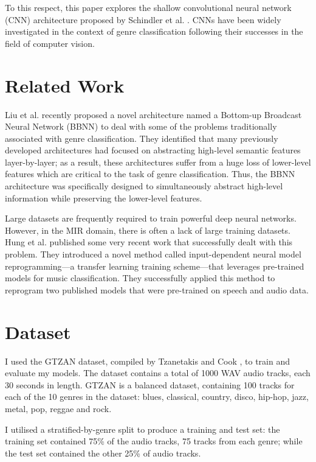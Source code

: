 \documentclass[conference]{IEEEtran}
\begin{document}
To this respect, this paper explores the shallow convolutional neural network (CNN) architecture proposed by Schindler et al. \cite{SchindlerLidyRauber}.
CNNs have been widely investigated in the context of genre classification following their successes in the field of computer vision.

\section{Related Work}

Liu et al. \cite{LiuFengLiuWangLiu} recently proposed a novel architecture named a Bottom-up Broadcast Neural Network (BBNN) to deal with some of the problems traditionally associated with genre classification.
They identified that many previously developed architectures had focused on abstracting high-level semantic features layer-by-layer; as a result, these architectures suffer from a huge loss of lower-level features which are critical to the task of genre classification.
Thus, the BBNN architecture was specifically designed to simultaneously abstract high-level information while preserving the lower-level features.

Large datasets are frequently required to train powerful deep neural networks.
However, in the MIR domain, there is often  a lack of large training datasets.
Hung et al. \cite{HungYangChenLerch} published some very recent work that successfully dealt with this problem.
They introduced a novel method called input-dependent neural model reprogramming---a transfer learning training scheme---that leverages pre-trained models for music classification.
They successfully applied this method to reprogram two published models that were pre-trained on speech and audio data.

\section{Dataset}

I used the GTZAN dataset, compiled by Tzanetakis and Cook \cite{TzanetakisCook}, to train and evaluate my models.
The dataset contains a total of 1000 WAV audio tracks, each 30 seconds in length.
GTZAN is a balanced dataset, containing 100 tracks for each of the 10 genres in the dataset: blues, classical, country, disco, hip-hop, jazz, metal, pop, reggae and rock.

I utilised a stratified-by-genre split to produce a training and test set: the training set contained 75\% of the audio tracks, 75 tracks from each genre; while the test set contained the other 25\% of audio tracks.
\end{document}
